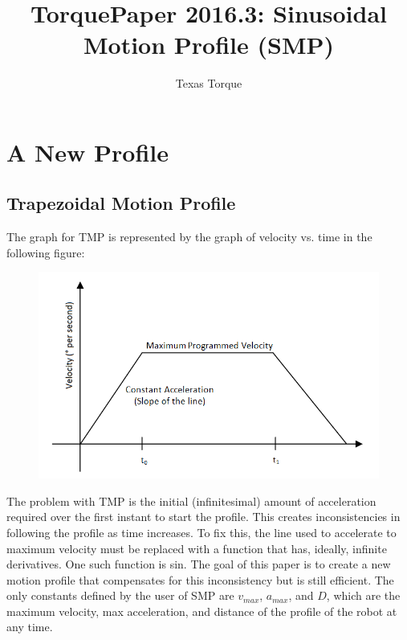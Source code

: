 \documentclass[a4paper,12pt]{report}
\author{Texas Torque}
\title{TorquePaper 2016.3: Sinusoidal Motion Profile (SMP)}
\newcommand{\tab}{\hspace{20pt}}
\begin{document}
	\maketitle
	\tableofcontents
	
	\chapter{A New Profile}
	\section{Trapezoidal Motion Profile}
	\tab The graph for TMP is represented by the graph of velocity vs. time in the following figure:
	
	\begin{figure}[h]
		\centering
		\includegraphics[scale=.3]{tmp.png}
	\end{figure}
	
	\tab The problem with TMP is the initial (infinitesimal) amount of acceleration required over the first instant to start the profile. This creates inconsistencies in following the profile as time increases. To fix this, the line used to accelerate to maximum velocity must be replaced with a function that has, ideally, infinite derivatives. One such function is sin.
	\tab The goal of this paper is to create a new motion profile that compensates for this inconsistency but is still efficient. The only constants defined by the user of SMP are $v_{max}$, $a_{max}$, and $D$, which are the maximum velocity, max acceleration, and distance of the profile of the robot at any time.
	
\end{document}
